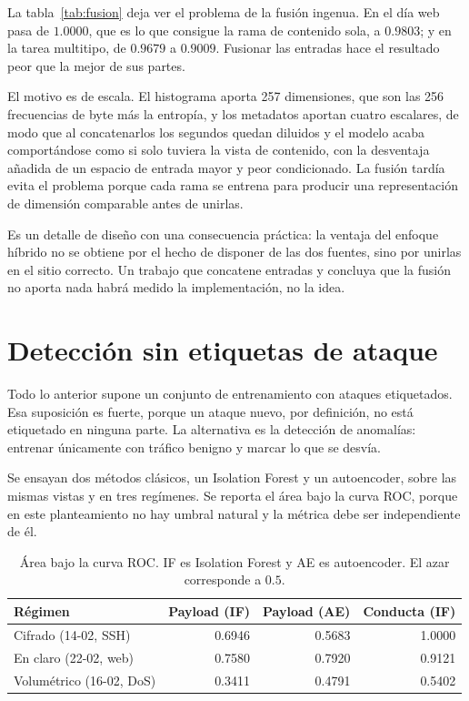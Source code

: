 La tabla~\ref{tab:fusion} deja ver el problema de la fusión ingenua. En el día
web pasa de $1.0000$, que es lo que consigue la rama de contenido sola, a
$0.9803$; y en la tarea multitipo, de $0.9679$ a $0.9009$. Fusionar las
entradas hace el resultado peor que la mejor de sus partes.

El motivo es de escala. El histograma aporta 257 dimensiones, que son las 256
frecuencias de byte más la entropía, y los metadatos aportan cuatro escalares, de
modo que al concatenarlos los segundos quedan diluidos y el modelo
acaba comportándose como si solo tuviera la vista de contenido, con la
desventaja añadida de un espacio de entrada mayor y peor condicionado. La fusión
tardía evita el problema porque cada rama se entrena para producir una
representación de dimensión comparable antes de unirlas.

Es un detalle de diseño con una consecuencia práctica: la ventaja del enfoque
híbrido no se obtiene por el hecho de disponer de las dos fuentes, sino por
unirlas en el sitio correcto. Un trabajo que concatene entradas y concluya que la
fusión no aporta nada habrá medido la implementación, no la idea.

\section{Detección sin etiquetas de ataque}
\label{sec:anomalia}

Todo lo anterior supone un conjunto de entrenamiento con ataques etiquetados. Esa
suposición es fuerte, porque un ataque nuevo, por definición, no está etiquetado
en ninguna parte. La alternativa es la detección de anomalías: entrenar
únicamente con tráfico benigno y marcar lo que se desvía.

Se ensayan dos métodos clásicos, un Isolation Forest y un autoencoder, sobre las
mismas vistas y en tres regímenes. Se reporta el área bajo la curva ROC, porque
en este planteamiento no hay umbral natural y la métrica debe ser independiente
de él.

\begin{table}[htbp]
  \centering
  \caption[Detección de anomalías entrenada solo con tráfico benigno]{Área bajo
  la curva ROC. IF es Isolation Forest y AE es autoencoder. El azar corresponde a
  $0.5$.}
  \label{tab:anomalia}
  \begin{tabular}{lrrr}
    \toprule
    \textbf{Régimen} & \textbf{Payload (IF)} & \textbf{Payload (AE)} & \textbf{Conducta (IF)} \\
    \midrule
    Cifrado (14-02, SSH)     & 0.6946 & 0.5683 & 1.0000 \\
    En claro (22-02, web)    & 0.7580 & 0.7920 & 0.9121 \\
    Volumétrico (16-02, DoS) & 0.3411 & 0.4791 & 0.5402 \\
    \bottomrule
  \end{tabular}
\end{table}

